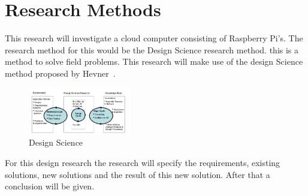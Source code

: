 \documentclass{sig-alternate-br}
\begin{document}
\section{Research Methods}
This research will investigate a cloud computer consisting of Raspberry Pi's. The research method for this would be the Design Science research method. this is a method to solve field problems. This research will make use of the design Science method proposed by Hevner~\cite{hevner:2007}. 
\begin{figure}[H]
	\centering 
	\includegraphics[width=0.4\textwidth]{Design_science.png}
	\caption{Design Science}
	\label{fig:design} %
\end{figure}
For this design research the research will specify the requirements, existing solutions, new solutions and the result of this new solution. After that a conclusion will be given. 
\end{document}
